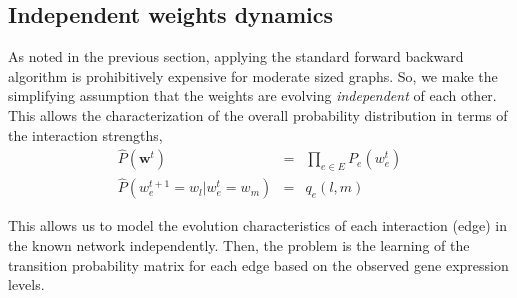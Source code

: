 \documentclass{bioinfo}
\begin{document}
\begin{methods}
\subsection{Independent weights dynamics}
\label{sec:factorial-model}
As noted in the previous section, applying the standard forward
backward algorithm is prohibitively expensive for moderate sized
graphs. So, we make the simplifying assumption that the weights are
evolving \emph{independent} of each other. This allows the
characterization of the overall probability distribution in terms of
the interaction strengths,  
\begin{eqnarray}
  \label{eq:q_mf}
  \hat{P}({\mathbf w}^{t}) &=& \prod_{e\in E} P_{e}(w_{e}^{t}) \\
  \hat{P}(w_{e}^{t+1} = w_{l} | w_{e}^{t} = w_{m}) &=& q_{e}(l, m) \label{eq:q-e-mf}
\end{eqnarray}

This allows us to model the evolution characteristics of each
interaction (edge) in the known network independently. Then, the
problem is the learning of the transition probability matrix for each
edge based on the observed gene expression levels. %

 



\end{methods}
\end{document}

